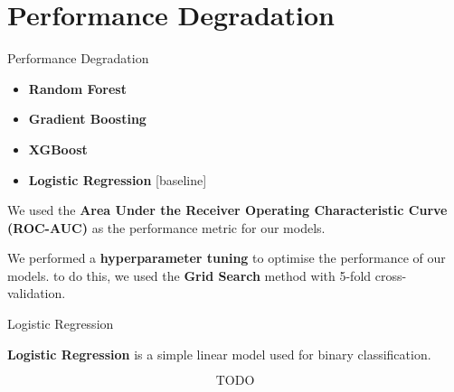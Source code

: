 \section{Performance Degradation} \label{sec:performance-degradation}

\begin{frame}{Performance Degradation}

    
    \begin{itemize}
        \item \textbf{Random Forest}
        \item \textbf{Gradient Boosting}
        \item \textbf{XGBoost}
        \item \textbf{Logistic Regression} [baseline]
    \end{itemize}

    
    We used the \textbf{Area Under the Receiver Operating Characteristic Curve (ROC-AUC)} as the performance metric for our models.

    
    We performed a \textbf{hyperparameter tuning} to optimise the performance of our models. to do this, we used the \textbf{Grid Search} method with 5-fold cross-validation.

\end{frame}

\begin{frame}{Logistic Regression}

    \textbf{Logistic Regression} is a simple linear model used for binary classification.

    $$
    \text{TODO}
    $$

\end{frame}

